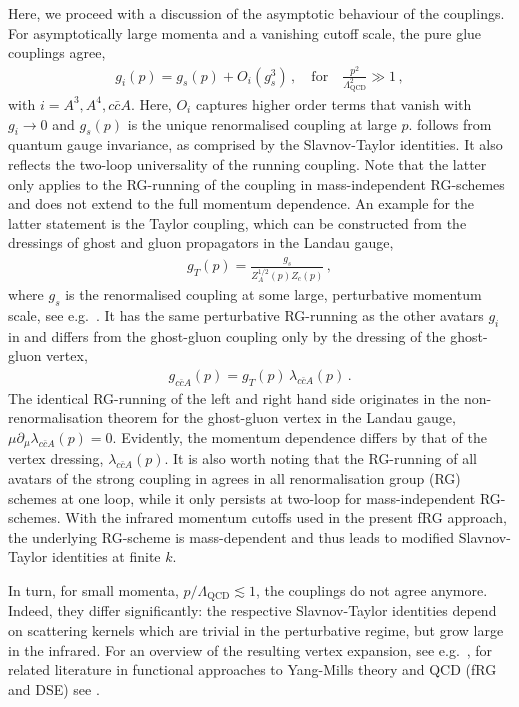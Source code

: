 \documentclass[aps,twocolumn,prd,superscriptaddress]{revtex4-2}
\begin{document}
Here, we proceed with a discussion of the asymptotic behaviour of the couplings. For asymptotically large momenta and a vanishing cutoff scale, the pure glue couplings agree,
%
\begin{align}
g_i(p)	= g_s(p) +O_i( g_s^3)\,,\quad \textrm{for} \quad \frac{p^2}{\Lambda^2_{\textrm{QCD}}}\gg 1\,,
	\label{eq:AgreeAvatars}
\end{align}
% 
with $i=A^3,A^4, c\bar c A$. Here, $O_i$ captures higher order terms that vanish with $g_i\to 0$ and $g_s(p)$ is the unique renormalised coupling at large $p$.  follows from quantum gauge invariance, as comprised by the Slavnov-Taylor identities. It also reflects the two-loop universality of the running coupling.
Note that the latter only applies to the RG-running of the coupling in mass-independent RG-schemes and does not extend to the full momentum dependence. An example for the latter statement is the Taylor coupling, which can be constructed from the dressings of ghost and gluon propagators in the Landau gauge, 
%
\begin{align} 
	g^{\ }_T(p) = \frac{g_s}{ Z^{1/2}_A(p) Z_c(p)} \,,
\end{align}
%
where $g_s$ is the renormalised coupling at some large, perturbative momentum scale, see e.g.~\cite{Hauck:1998hv, vonSmekal:2009ae}. It has the same perturbative RG-running as the other avatars $g_i$ in  and differs from the ghost-gluon coupling only by the dressing of the ghost-gluon vertex, 
%
\begin{align}
	g_{c\bar c A}(p) =  g^{\ }_T(p)\, \lambda_{c\bar c A}(p)\,. 
	\label{eq:Taylor-GhostGluon}
\end{align}
%
The identical RG-running of the left and right hand side originates in the non-renormalisation theorem for the ghost-gluon vertex in the Landau gauge, $\mu\partial_\mu \lambda_{c\bar c A}(p)=0$. Evidently, the momentum dependence differs by that of the vertex dressing, $\lambda_{c\bar c A}(p)$. It is also worth noting that the RG-running of all avatars of the strong coupling in  agrees in all renormalisation group (RG) schemes at one loop, while it only persists at two-loop for mass-independent RG-schemes. 
With the infrared momentum cutoffs used in the present fRG approach, the underlying RG-scheme is mass-dependent and thus leads to modified Slavnov-Taylor identities at finite $k$. 

In turn, for small momenta, $p/\Lambda_{\textrm{QCD}}\lesssim 1$, the couplings do not agree anymore. Indeed, they differ significantly: the respective Slavnov-Taylor identities depend on scattering kernels which are trivial in the perturbative regime, but grow large in the infrared. For an overview of the resulting vertex expansion, see e.g.~, for related literature in functional approaches to Yang-Mills theory and QCD (fRG and DSE) see \cite{Fischer:2008uz, Aguilar:2009nf, Mitter:2014wpa, Cyrol:2016tym, Cyrol:2017ewj, Binosi:2016nme, Huber:2018ned, Huber:2020keu}.
\end{document}
